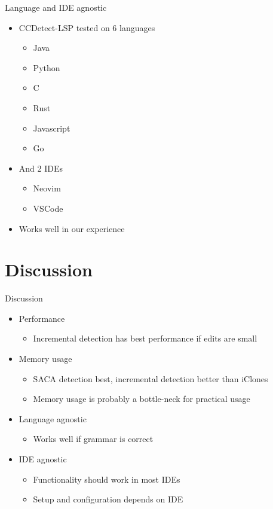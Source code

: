 \documentclass[aspectratio=1610, xcolor=table]{beamer}
\begin{document}
\begin{frame}{Language and IDE agnostic}
    \begin{itemize}
        \item CCDetect-LSP tested on 6 languages
            \begin{itemize}
                \item Java
                \item Python
                \item C
                \item Rust
                \item Javascript
                \item Go
            \end{itemize}
        \item And 2 IDEs
            \begin{itemize}
                \item Neovim
                \item VSCode
            \end{itemize}
        \item Works well in our experience
    \end{itemize}

\end{frame}
    
\section{Discussion}
\begin{frame}{Discussion}
    \begin{itemize}
        \item Performance
            \begin{itemize}
                \item Incremental detection has best performance if edits are small
            \end{itemize}
        \item Memory usage
            \begin{itemize}
                \item SACA detection best, incremental detection better than iClones
                \item Memory usage is probably a bottle-neck for practical usage
            \end{itemize}
        \item Language agnostic
            \begin{itemize}
                \item Works well if grammar is correct
            \end{itemize}
        \item IDE agnostic
            \begin{itemize}
                \item Functionality should work in most IDEs
                \item Setup and configuration depends on IDE
            \end{itemize}
    \end{itemize}
\end{frame}
\end{document}
